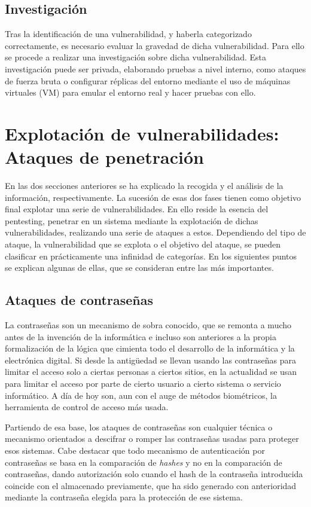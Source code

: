 \subsection{Investigación}

Tras la identificación de una vulnerabilidad, y haberla categorizado correctamente, es necesario evaluar la gravedad de dicha vulnerabilidad. Para ello se procede a realizar una investigación sobre dicha vulnerabilidad. Esta investigación puede ser privada, elaborando pruebas a nivel interno, como ataques de fuerza bruta o configurar réplicas del entorno mediante el uso de máquinas virtuales (VM) para emular el entorno real y hacer pruebas con ello.

\section[Explotación de vulnerabilidades]{Explotación de vulnerabilidades: Ataques de penetración}

En las dos secciones anteriores se ha explicado la recogida y el análisis de la información, respectivamente. La sucesión de esas dos fases tienen como objetivo final explotar una serie de vulnerabilidades. En ello reside la esencia del pentesting, penetrar en un sistema mediante la explotación de dichas vulnerabilidades, realizando una serie de ataques a estos. Dependiendo del tipo de ataque, la vulnerabilidad que se explota o el objetivo del ataque, se pueden clasificar en prácticamente una infinidad de categorías. En los siguientes puntos se explican algunas de ellas, que se consideran entre las más importantes.

\subsection{Ataques de contraseñas}
La contraseñas son un mecanismo de sobra conocido, que se remonta a mucho antes de la invención de la informática e incluso son anteriores a la propia formalización de la lógica que cimienta todo el desarrollo de la informática y la electrónica digital. Si desde la antigüedad se llevan usando las contraseñas para limitar el acceso solo a ciertas personas a ciertos sitios, en la actualidad se usan para limitar el acceso por parte de cierto usuario a cierto sistema o servicio informático. A día de hoy son, aun con el auge de métodos biométricos, la herramienta de control de acceso más usada.

Partiendo de esa base, los ataques de contraseñas son cualquier técnica o mecanismo orientados a descifrar o romper las contraseñas usadas para proteger esos sistemas. Cabe destacar que todo mecanismo de autenticación por contraseñas se basa en la comparación de \emph{hashes} y no en la comparación de contraseñas, dando autorización solo cuando el hash de la contraseña introducida coincide con el almacenado previamente, que ha sido generado con anterioridad mediante la contraseña elegida para la protección de ese sistema.

